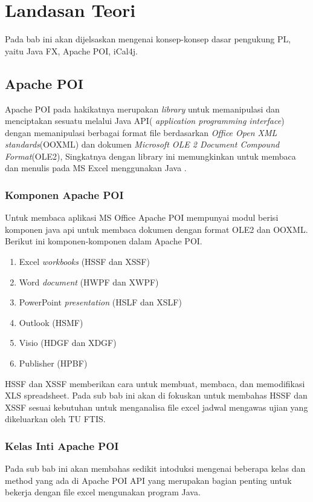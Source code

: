 \chapter{Landasan Teori}
\label{chap:teori}
Pada bab ini akan dijelsaskan mengenai konsep-konsep dasar pengukung PL, yaitu Java FX, Apache POI, iCal4j.

\section{Apache POI}
\label{sec:apache} 

Apache POI pada hakikatnya merupakan \textit{library} untuk memanipulasi dan menciptakan sesuatu melalui Java API( \textit{application programming interface}) dengan memanipulasi berbagai format file berdasarkan \textit{Office Open XML standards}(OOXML) dan dokumen \textit{Microsoft OLE 2 Document Compound Format}(OLE2), Singkatnya dengan library ini memungkinkan untuk membaca dan menulis pada MS Excel menggunakan Java \cite{apachepoi}. \\


\subsection{Komponen Apache POI}
\label{subs:komponen} 
Untuk membaca aplikasi MS Office Apache POI mempunyai modul berisi komponen java api untuk membaca dokumen dengan format OLE2 dan OOXML. Berikut ini komponen-komponen dalam Apache POI.\cite{apachepoi}  

\begin{enumerate}
	\item Excel \textit{workbooks} (HSSF dan XSSF)
	\item Word \textit{document} (HWPF dan XWPF)
	\item PowerPoint \textit{presentation} (HSLF dan XSLF)
	\item Outlook (HSMF)
	\item Visio (HDGF dan XDGF)
	\item Publisher (HPBF)
\end{enumerate}

HSSF dan XSSF memberikan cara untuk membuat, membaca, dan memodifikasi XLS spreadsheet. Pada sub bab ini akan di fokuskan untuk membahas HSSF dan XSSF sesuai kebutuhan untuk menganalisa file excel jadwal mengawas ujian yang dikeluarkan oleh TU FTIS.\cite{apachepoi}


\subsection{Kelas Inti Apache POI}
\label{subs:kelas_inti}  
Pada sub bab ini akan membahas sedikit intoduksi mengenai beberapa kelas dan method yang ada di Apache POI API yang merupakan bagian penting untuk bekerja dengan file excel mengunakan program Java.\cite{apachepoi2}

